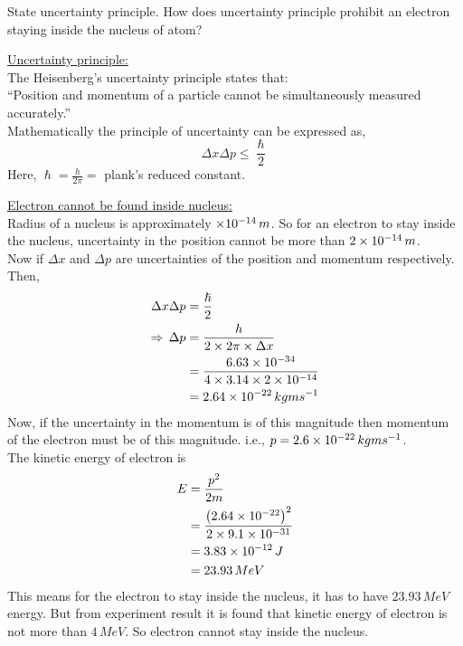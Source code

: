 \documentclass[../main.tex]{subfiles}
\begin{document}
\begin{prob}
    State uncertainty principle. How does uncertainty principle prohibit an electron staying inside the nucleus of atom?
\end{prob}
\begin{soln}
    \underline{Uncertainty principle:}\\
    The Heisenberg's uncertainty principle states that:\\ 
    \indent ``Position and momentum of a particle cannot be simultaneously measured accurately.''\\
    Mathematically the principle of uncertainty can be expressed as,
    \[\Delta x\Delta p\leq \frac{\hslash }{2}\]
    Here, $ \hslash=\frac{h}{2\pi}= $ plank's reduced constant.

    \underline{Electron cannot be found inside nucleus:}\\
    \indent Radius of a nucleus is approximately $ \times 10^{-14}\,m $. So for an electron to stay inside the nucleus, uncertainty in the position cannot be more than $ 2\times 10^{-14}\,m $.\\

    Now if $ \Delta x $ and $ \Delta p $ are uncertainties of the position and momentum respectively. Then,
    \begin{align*}
        \Delta x \Delta p&=\frac{\hslash }{2}\\
        \Rightarrow\, \Delta p&=\frac{h}{2\times 2\pi\times\Delta x}\\
        &=\frac{6.63\times 10^{-34}}{4\times 3.14\times2\times 10^{-14}}\\
        &=2.64\times 10^{-22}\,kgms^{-1}
    \end{align*}
    Now, if the uncertainty in the momentum is of this magnitude then momentum of the electron must be of this magnitude. i.e., $ p=2.6\times 10^{-22}\,kgms^{-1} $.\\
    The kinetic energy of electron is 
    \begin{align*}
        E&=\frac{p^2}{2m}\\
        &=\frac{\left( 2.64\times 10^{-22} \right)^2}{2\times 9.1\times 10^{-31}}\\
        &=3.83\times 10^{-12}\,J\\
        &=23.93\,MeV
    \end{align*}
    This means for the electron to stay inside the nucleus, it has to have $ 23.93\,MeV $ energy. But from experiment result it is found that kinetic energy of electron is not more than $ 4\,MeV $. So electron cannot stay inside the nucleus.
\end{soln}
\end{document}
